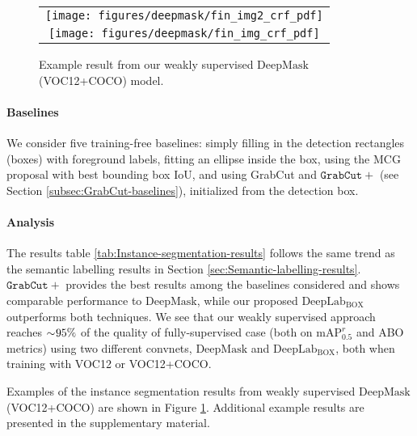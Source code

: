 \documentclass[10pt,english,british,twocolumn]{article}
\providecommand{\tabularnewline}{\\}
\begin{document}
\begin{figure}
\begin{centering}
\begin{tabular}{c}
\texttt{[image: figures/deepmask/fin\_img2\_crf\_pdf]}\tabularnewline
\texttt{[image: figures/deepmask/fin\_img\_crf\_pdf]}\tabularnewline
\end{tabular}\vspace{-0.5em}
\par\end{centering}
\caption{\label{fig:Instance-segmentation-example}Example result from our
weakly supervised $\mathrm{DeepMask}$ (VOC12+COCO) model.}
\vspace{-1em}
\end{figure}


\paragraph{Baselines}

We consider five training-free baselines: simply filling in the detection
rectangles (boxes) with foreground labels, fitting an ellipse inside
the box, using the MCG proposal with best bounding box IoU, and using
GrabCut and $\mathtt{GrabCut+}$ (see Section \ref{subsec:GrabCut-baselines}),
initialized from the detection box. 

\paragraph{Analysis}

The results table \ref{tab:Instance-segmentation-results} follows
the same trend as the semantic labelling results in Section \ref{sec:Semantic-labelling-results}.
$\mathtt{GrabCut+}$ provides the best results among the baselines
considered and shows comparable performance to $\mathrm{DeepMask}$,
while our proposed $\mathrm{DeepLab_{BOX}}$ outperforms both techniques.
We see that our weakly supervised approach reaches $\sim\negmedspace95\%$
of the quality of fully-supervised case (both on $\text{mAP}_{0.5}^{r}$
and ABO metrics) using two different convnets, $\mathrm{DeepMask}$
and $\mathrm{DeepLab_{BOX}}$, both when training with VOC12 or VOC12+COCO. 

Examples of the instance segmentation results from weakly supervised
$\mathrm{DeepMask}$ (VOC12+COCO) are shown in Figure \ref{fig:Instance-segmentation-example}.
Additional example results are presented in the supplementary material.
\end{document}
